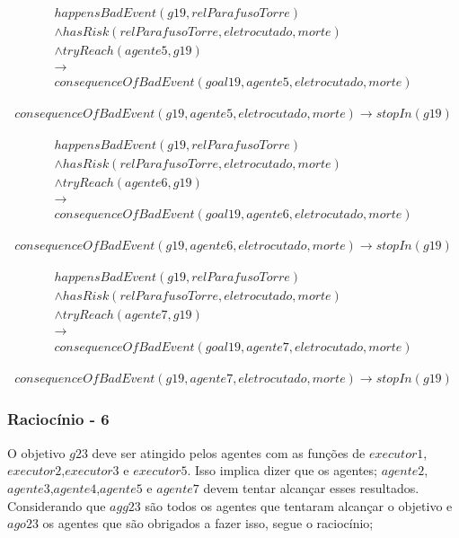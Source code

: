 \documentclass[12pt]{article}
\begin{document}
\begin{eqnarray}\nonumber
	happensBadEvent(g19,relParafusoTorre)  \nonumber \\
	\wedge hasRisk(relParafusoTorre,eletrocutado,morte) \nonumber \\ 
	\wedge tryReach(agente5,g19) \nonumber \\ 
	\to \nonumber \\ 
	consequenceOfBadEvent(goal19,agente5,eletrocutado,morte)
\end{eqnarray}

\begin{eqnarray}
	consequenceOfBadEvent(g19,agente5,eletrocutado,morte) \to stopIn(g19)
\end{eqnarray}

\begin{eqnarray}\nonumber
	happensBadEvent(g19,relParafusoTorre)  \nonumber \\
	\wedge hasRisk(relParafusoTorre,eletrocutado,morte) \nonumber \\ 
	\wedge tryReach(agente6,g19) \nonumber \\ 
	\to \nonumber \\ 
	consequenceOfBadEvent(goal19,agente6,eletrocutado,morte)
\end{eqnarray}

\begin{eqnarray}
	consequenceOfBadEvent(g19,agente6,eletrocutado,morte) \to stopIn(g19)
\end{eqnarray}

\begin{eqnarray}\nonumber
	happensBadEvent(g19,relParafusoTorre)  \nonumber \\
	\wedge hasRisk(relParafusoTorre,eletrocutado,morte) \nonumber \\ 
	\wedge tryReach(agente7,g19) \nonumber \\ 
	\to \nonumber \\ 
	consequenceOfBadEvent(goal19,agente7,eletrocutado,morte)
\end{eqnarray}

\begin{eqnarray}
	consequenceOfBadEvent(g19,agente7,eletrocutado,morte) \to stopIn(g19)
\end{eqnarray}


\subsubsection{Raciocínio - 6}

O objetivo $g23$ deve ser atingido pelos agentes com as funções de $executor1$,$executor2$,$executor3$ e $executor5$. Isso implica dizer que os agentes; $agente2$,$agente3$,$agente4$,$agente5$ e $agente7$ devem tentar alcançar esses resultados. Considerando que $agg23$ são todos os agentes que tentaram alcançar o objetivo e $ago23$ os agentes que são obrigados a fazer isso, segue o raciocínio;
\end{document}
